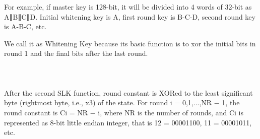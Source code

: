For example, if master key is 128-bit, it will be divided into 4 words of 32-bit as A∥B∥C∥D. Initial whitening key is A, first round key is B-C-D, second round key is A-B-C, etc. 

We call it as Whitening Key because its basic  function is to xor the initial bits in round 1 and the final bits after the last round.

\section*{\fontsize{20}{24}\selectfont{\color{red} {What Ci Represents?}}}\\

After the second SLK function, round constant is XORed to the least significant byte (rightmost byte, i.e., x3) of the state. For round i = 0,1,...,NR − 1, the round constant is Ci = NR − i, where NR is the number of rounds, and Ci is represented as 8-bit little endian integer, that is 12 = 00001100, 11 = 00001011, etc. 


